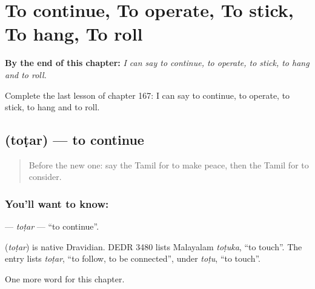 
\chapter{To continue, To operate, To stick, To hang, To roll}
\label{ch:ta-to-continue-to-operate-to-stick-to-hang-to-roll}

\begin{chapteropening}
\textbf{By the end of this chapter:} \emph{I can say to continue, to operate, to stick, to hang and to roll.}

Complete the last lesson of chapter 167: I can say to continue, to operate, to stick, to hang and to roll.
\end{chapteropening}

\section[\texorpdfstring{\ta{தொடர்} (toṭar)}{தொடர் (toṭar)}]{ (toṭar) — to continue}

\label{lesson:TA-C167-totar}



\begin{quote}
Before the new one: say the Tamil for to make peace, then the Tamil for to consider.
\end{quote}

\subsection*{You'll want to know: }
\textbf{} — \emph{toṭar} — \textquotedblleft{}to continue\textquotedblright{}.

\begin{cousinweb}
\textbf{} (\emph{toṭar}) is native Dravidian. DEDR 3480 lists Malayalam \emph{toṭuka}, \textquotedblleft{}to touch\textquotedblright{}. The entry lists \emph{toṭar}, \textquotedblleft{}to follow, to be connected\textquotedblright{}, under \emph{toṭu}, \textquotedblleft{}to touch\textquotedblright{}.
\end{cousinweb}

\begin{grammarlens}[title={What you've built}]
One more word for this chapter.
\end{grammarlens}

